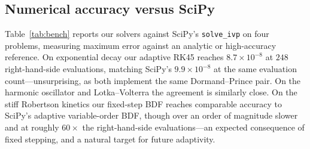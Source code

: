 \documentclass[sigplan,nonacm,screen]{acmart}
\begin{document}
\subsection{Numerical accuracy versus SciPy}
Table~\ref{tab:bench} reports our solvers against SciPy's
\texttt{solve\_ivp} on four problems, measuring maximum error
against an analytic or high-accuracy reference. On exponential decay our adaptive
RK45 reaches $8.7\times10^{-8}$ at $248$ right-hand-side evaluations, matching
SciPy's $9.9\times10^{-8}$ at the same evaluation count---unsurprising, as both
implement the same Dormand--Prince pair. On the harmonic oscillator and
Lotka--Volterra the agreement is similarly close. On the stiff Robertson kinetics
our fixed-step BDF reaches comparable accuracy to SciPy's adaptive
variable-order BDF, though over an order of magnitude slower and at roughly
$60\times$ the right-hand-side evaluations---an expected consequence of fixed
stepping, and a natural target for future adaptivity.

\begin{table}[t]
\caption{Maximum error, wall-clock time, and right-hand-side evaluations versus
SciPy. ``ours'' denotes the verisolv solver; time is the minimum over repeated
runs. Lower is better throughout.}
\label{tab:bench}
\small
{}
\end{table}
\end{document}
